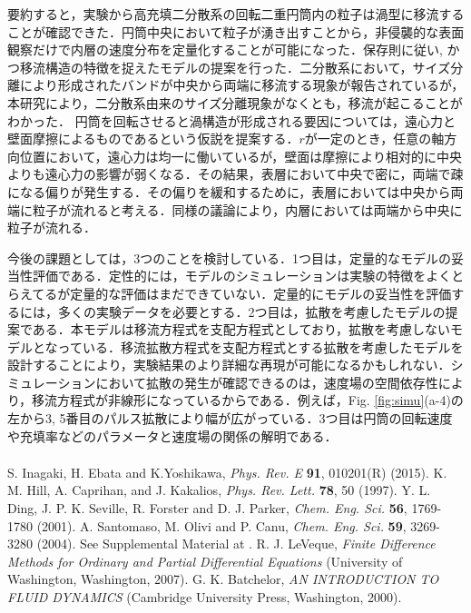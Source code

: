 \documentclass[prl,twocolumn,superscriptaddress]{revtex4}
\begin{document}
要約すると，実験から高充填二分散系の回転二重円筒内の粒子は渦型に移流することが確認できた．円筒中央において粒子が湧き出すことから，非侵襲的な表面観察だけで内層の速度分布を定量化することが可能になった．保存則に従い, かつ移流構造の特徴を捉えたモデルの提案を行った．二分散系において，サイズ分離により形成されたバンドが中央から両端に移流する現象が報告されているが，本研究により，二分散系由来のサイズ分離現象がなくとも，移流が起こることがわかった．
円筒を回転させると渦構造が形成される要因については，遠心力と壁面摩擦によるものであるという仮説を提案する．$r$が一定のとき，任意の軸方向位置において，遠心力は均一に働いているが，壁面は摩擦により相対的に中央よりも遠心力の影響が弱くなる．その結果，表層において中央で密に，両端で疎になる偏りが発生する．その偏りを緩和するために，表層においては中央から両端に粒子が流れると考える．同様の議論により，内層においては両端から中央に粒子が流れる．

今後の課題としては，3つのことを検討している．1つ目は，定量的なモデルの妥当性評価である．定性的には，モデルのシミュレーションは実験の特徴をよくとらえてるが定量的な評価はまだできていない．定量的にモデルの妥当性を評価するには，多くの実験データを必要とする．2つ目は，拡散を考慮したモデルの提案である．本モデルは移流方程式を支配方程式としており，拡散を考慮しないモデルとなっている．移流拡散方程式を支配方程式とする拡散を考慮したモデルを設計することにより，実験結果のより詳細な再現が可能になるかもしれない．シミュレーションにおいて拡散の発生が確認できるのは，速度場の空間依存性により，移流方程式が非線形になっているからである．例えば，Fig. \ref{fig:simu}(a-4)の左から3, 5番目のパルス拡散により幅が広がっている．3つ目は円筒の回転速度や充填率などのパラメータと速度場の関係の解明である．\\
\begin{eqnarray*}
\end{eqnarray*}

\begin{thebibliography}{}
S. Inagaki, H. Ebata and K.Yoshikawa, {\it{Phys. Rev. E}} {\bf 91}, 010201(R) (2015).
K. M. Hill, A. Caprihan, and J. Kakalios, {\it{Phys. Rev. Lett.}} {\bf 78}, 50 (1997).
Y. L. Ding, J. P. K. Seville, R. Forster and D. J. Parker, {\it{Chem. Eng. Sci.}} {\bf 56}, 1769-1780 (2001).
A. Santomaso, M. Olivi and P. Canu, {\it{Chem. Eng. Sci.}} {\bf 59}, 3269-3280 (2004).
See Supplemental Material at .
R. J. LeVeque, {\it{Finite Difference Methods for Ordinary and Partial Differential Equations}} (University of Washington, Washington, 2007).
G. K. Batchelor, {\it{AN INTRODUCTION TO FLUID DYNAMICS}} (Cambridge University Press, Washington, 2000).
\end{thebibliography}
\end{document}
